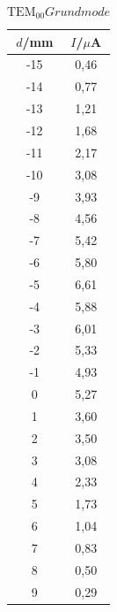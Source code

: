 \begin{table}[H]
	\begin{center}
		\begin{tabular}{c c}
			\toprule
			\(d\)/mm & \(I\)/\(\mu\)A \\
			\midrule
			-15  &  0,46\\                                                                                            
			-14     &0,77  \\                                                                                          
			-13     &1,21    \\                                                                                        
			-12     &1,68      \\                                                                                      
			-11     &2,17        \\                                                                                    
			-10     &3,08          \\                                                                                  
			-9      &3,93             \\                                                                               
			-8      &4,56               \\                                                                             
			-7      &5,42                 \\
			-6      &5,80                   \\                                                                         
			-5      &6,61                     \\                                                                       
			-4      &5,88                       \\                                                                     
			-3      &6,01                         \\                                                                   
			-2      &5,33                           \\
			-1      &4,93\\
			0       &5,27\\
			1       &3,60\\
			2       &3,50\\
			3       &3,08\\
			4       &2,33\\
			5       &1,73\\
			6       &1,04\\
			7       &0,83\\
			8       &0,50\\
			9       &0,29\\
			\bottomrule
		\end{tabular}
		\caption{\(\text{TEM}_{00} Grundmode\)}
		\label{tab:t5}
	\end{center}
\end{table}

